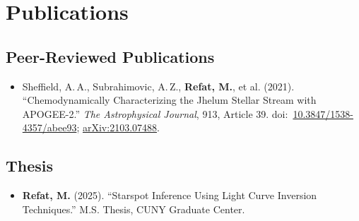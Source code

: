 
\section{Publications}

\subsection*{Peer-Reviewed Publications}
\begin{itemize}[leftmargin=1.2em,label={--},itemsep=2pt,topsep=0pt]
  \item Sheffield, A.\,A., Subrahimovic, A.\,Z., \textbf{Refat, M.}, et al. (2021).
  ``Chemodynamically Characterizing the Jhelum Stellar Stream with APOGEE-2.''
  \textit{The Astrophysical Journal}, 913, Article 39.
  doi:~\href{https://doi.org/10.3847/1538-4357/abee93}{10.3847/1538-4357/abee93};
  \href{https://arxiv.org/abs/2103.07488}{arXiv:2103.07488}.
\end{itemize}

\subsection*{Thesis}
\begin{itemize}[leftmargin=1.2em,label={--},itemsep=2pt,topsep=0pt]
  \item \textbf{Refat, M.} (2025).
  ``Starspot Inference Using Light Curve Inversion Techniques.''
  M.S. Thesis, CUNY Graduate Center.
\end{itemize}
